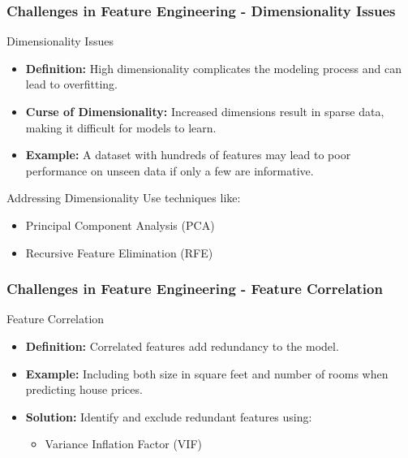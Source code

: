\documentclass[aspectratio=169]{beamer}
\begin{document}
\begin{frame}[fragile]
    \frametitle{Challenges in Feature Engineering - Dimensionality Issues}
    \begin{block}{Dimensionality Issues}
        \begin{itemize}
            \item \textbf{Definition:} High dimensionality complicates the modeling process and can lead to overfitting.
            \item \textbf{Curse of Dimensionality:} Increased dimensions result in sparse data, making it difficult for models to learn.
            \item \textbf{Example:} A dataset with hundreds of features may lead to poor performance on unseen data if only a few are informative.
        \end{itemize}
        \begin{block}{Addressing Dimensionality}
            Use techniques like:
            \begin{itemize}
                \item Principal Component Analysis (PCA)
                \item Recursive Feature Elimination (RFE)
            \end{itemize}
        \end{block}
    \end{block}
\end{frame}

\begin{frame}[fragile]
    \frametitle{Challenges in Feature Engineering - Feature Correlation}
    \begin{block}{Feature Correlation}
        \begin{itemize}
            \item \textbf{Definition:} Correlated features add redundancy to the model.
            \item \textbf{Example:} Including both size in square feet and number of rooms when predicting house prices.
            \item \textbf{Solution:} Identify and exclude redundant features using:
            \begin{itemize}
                \item Variance Inflation Factor (VIF)
            \end{itemize}
        \end{itemize}
    \end{block}
\end{frame}
\end{document}

